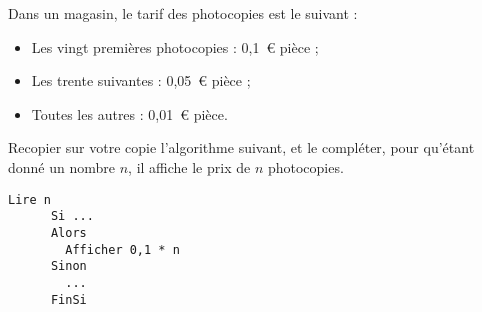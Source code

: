 \documentclass[12pt]{article}
\begin{document}
\begin{exercice}
  Dans un magasin, le tarif des photocopies est le suivant :
  \begin{itemize}[$\bullet$]
    \item Les vingt premières photocopies : 0,1~\euro{} pièce ;
    \item Les trente suivantes : 0,05~\euro{} pièce ;
    \item Toutes les autres : 0,01~\euro{} pièce.
  \end{itemize}

  Recopier sur votre copie l'algorithme suivant, et le compléter, pour qu'étant donné un nombre $n$, il affiche le prix de $n$ photocopies.
      \begin{lstlisting}[language=naturel,frame=lines,mathescape=true]
      Lire n
      Si ...
      Alors
        Afficher 0,1 * n
      Sinon
        ...
      FinSi
      \end{lstlisting}
\end{exercice}
\end{document}
